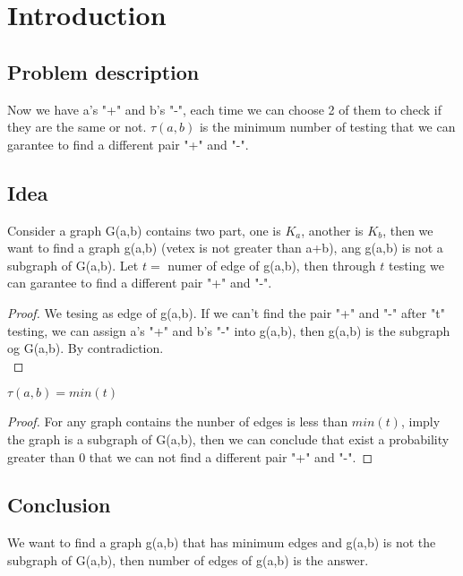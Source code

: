 \section{Introduction}
\subsection*{Problem description}
Now we have a's "+" and b's "-", each time we can choose 2 of them to check if they are the same or not.  $\tau(a,b)$ is the minimum number of testing that we can garantee to find a different pair "+" and "-".  \\


\subsection*{Idea}
Consider a graph G(a,b) contains two part, one is $K_a$, another is $K_b$, then we want to find a graph g(a,b) (vetex is not greater than a+b), ang g(a,b) is not a subgraph of G(a,b). Let $t =$ numer of edge of g(a,b), then through  $t$ testing we can   garantee to find a different pair "+" and "-".  \\

\begin{proof}
We tesing as edge of g(a,b). If we can't find the pair "+" and "-" after "t" testing, we can assign a's "+" and b's "-" into g(a,b),  then g(a,b) is the subgraph og G(a,b). By contradiction. \\
\end{proof}

\begin{lemma}
$\tau(a,b)= min(t)$ 
\end{lemma}

\begin{proof}
For any graph contains the nunber of edges is less than $min(t)$, imply the graph is a subgraph of G(a,b), then we can conclude that exist a probability greater than 0 that we can not  find a different pair "+" and "-".
\end{proof}

\subsection*{Conclusion}
We want to find a graph g(a,b) that has minimum edges and g(a,b) is not the subgraph of G(a,b), then number of edges of g(a,b) is the answer.
